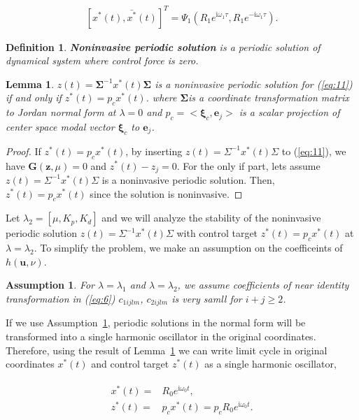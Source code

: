\documentclass[openacc]{rsproca_new}%
\def\vec#1{\ensuremath{\mathbf{#1}}}
\newcommand{\Eref}[1]{(\ref{#1})}
\newcommand{\asref}[1]{Assumption~\ref{#1}}
\newcommand{\Lref}[1]{Lemma~\ref{#1}}
\newtheorem{lemma}{\bf Lemma}[section]
\newtheorem{definition}{\bf Definition}[section]
\newtheorem{assumption}{\bf Assumption}[section]
\begin{document}
\begin{align}\label{eq:16}
    [x^*(t),\bar {x^*}(t)]^T=\Psi_1(R_1e^{\textrm{i}\omega_1 \tau},R_1e^{-\textrm{i}\omega_1 \tau}).
\end{align}

\noindent

\begin{definition}\label{d1}
\textbf{Noninvasive periodic solution} is a periodic solution of dynamical system where control force is zero.
\end{definition}

\begin{lemma}\label{l1}
$z(t)=\vec{\Sigma}^{-1}x^*(t)\vec{\Sigma}$ is a noninvasive periodic solution for \Eref{eq:11} if and only if $z^*(t)=p_c x^*(t)$.
where $\vec{\Sigma}$is a coordinate transformation matrix to Jordan normal form at $\lambda=0$ and $p_c=<\vec{\xi}_c,\vec{e}_{j}>$ is a scalar projection of center space modal vector $\vec{\xi}_c$ to $\vec{e}_{j}$.
\end{lemma}

\begin{proof}
If $z^*(t)=p_cx^*(t)$, by inserting $z(t)=\Sigma^{-1}x^*(t)\Sigma$ to \Eref{eq:11}, we have $\vec{G}(\vec{z},\mu)=0$ and $z^*(t)-z_j=0$. For the only if part, lets assume $z(t)=\Sigma^{-1}x^*(t)\Sigma$ is a noninvasive periodic solution. Then, $z^*(t)=p_cx^*(t)$ since the solution is noninvasive.
\end{proof}

\noindent Let $\lambda_2=[\mu,K_p,K_d]$ and we will analyze the stability of the noninvasive periodic solution $z(t)=\Sigma^{-1}x^*(t)\Sigma$ with control target $z^*(t)=p_cx^*(t)$  at $\lambda=\lambda_2$. To simplify the problem, we make an assumption on the coefficeints of $h(\vec{u},\nu)$.

\begin{assumption}\label{a1}
For $\lambda=\lambda_1$ and $\lambda=\lambda_2$, we assume coefficients of near identity transformation in \Eref{eq:6} $c_{1ijlm}$, $c_{2ijlm}$ is very samll for $i+j\geq 2$.
\end{assumption}

\noindent  If we use \asref{a1}, periodic solutions in the normal form will be transformed into a single harmonic oscillator in the original coordinates. Therefore, using the result of \Lref{l1} we can write limit cycle in original coordinates $x^*(t)$ and control target  $z^*(t)$ as a single harmonic oscillator,

\begin{align}\label{eq:17}
    \begin{split}
x^*(t)=&R_0e^{\textrm{i}\omega_0 t},\\
z^*(t)=&p_cx^*(t)=p_cR_0e^{\textrm{i}\omega_0 t}.
\end{split}
\end{align}
\end{document}
